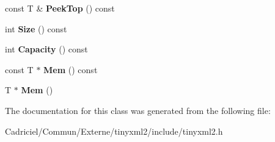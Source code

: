 \begin{DoxyCompactItemize}
\item 
const T \& {\bfseries Peek\+Top} () const \hypertarget{classtinyxml2_1_1_dyn_array_a9c2282ea8901b5a92ccaac2e6166a788}{}\label{classtinyxml2_1_1_dyn_array_a9c2282ea8901b5a92ccaac2e6166a788}

\item 
int {\bfseries Size} () const \hypertarget{classtinyxml2_1_1_dyn_array_a1299b257b62ea6b4983c488867f219b0}{}\label{classtinyxml2_1_1_dyn_array_a1299b257b62ea6b4983c488867f219b0}

\item 
int {\bfseries Capacity} () const \hypertarget{classtinyxml2_1_1_dyn_array_a8edbe90ed53b2e46b1b5cf53b261e4e7}{}\label{classtinyxml2_1_1_dyn_array_a8edbe90ed53b2e46b1b5cf53b261e4e7}

\item 
const T $\ast$ {\bfseries Mem} () const \hypertarget{classtinyxml2_1_1_dyn_array_a1f39330daeb97d3d1dc3fc12dcf7ac67}{}\label{classtinyxml2_1_1_dyn_array_a1f39330daeb97d3d1dc3fc12dcf7ac67}

\item 
T $\ast$ {\bfseries Mem} ()\hypertarget{classtinyxml2_1_1_dyn_array_a0e0d60b399d54fad5b33d5008bc59c8e}{}\label{classtinyxml2_1_1_dyn_array_a0e0d60b399d54fad5b33d5008bc59c8e}

\end{DoxyCompactItemize}


The documentation for this class was generated from the following file\+:\begin{DoxyCompactItemize}
\item 
Cadriciel/\+Commun/\+Externe/tinyxml2/include/tinyxml2.\+h\end{DoxyCompactItemize}

